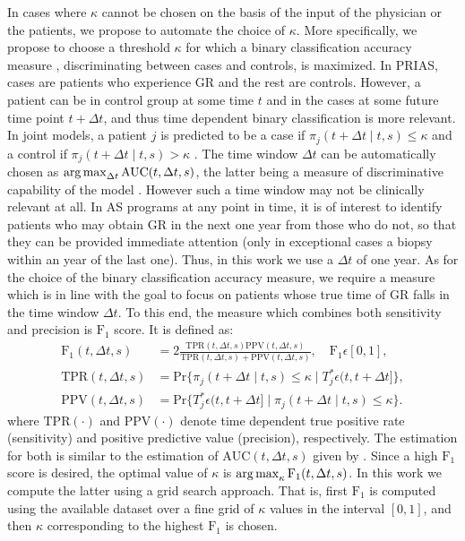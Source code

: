 In cases where $\kappa$ cannot be chosen on the basis of the input of the physician or the patients, we propose to automate the choice of $\kappa$. More specifically, we propose to choose a threshold $\kappa$ for which a binary classification accuracy measure \citep{lopez2014optimalcutpoints}, discriminating between cases and controls, is maximized. In PRIAS, cases are patients who experience GR and the rest are controls. However, a patient can be in control group at some time $t$ and in the cases at some future time point $t + \Delta t$, and thus time dependent binary classification is more relevant. In joint models, a patient $j$ is predicted to be a case if $\pi_j(t + \Delta t \mid t,s) \leq \kappa$ and a control if $\pi_j(t + \Delta t \mid t,s) > \kappa$ \citep*{rizopoulosJMbayes, landmarking2017}. The time window $\Delta t$ can be automatically chosen as $\operatorname{arg\,max}_{\Delta t}\mbox{AUC}(t, \Delta t, s)$, the latter being a measure of discriminative capability of the model \citep{rizopoulosJMbayes,landmarking2017}. However such a time window may not be clinically relevant at all. In AS programs at any point in time, it is of interest to identify patients who may obtain GR in the next one year from those who do not, so that they can be provided immediate attention (only in exceptional cases a biopsy within an year of the last one). Thus, in this work we use a $\Delta t$ of one year. As for the choice of the binary classification accuracy measure, we require a measure which is in line with the goal to focus on patients whose true time of GR falls in the time window $\Delta t$. To this end, the measure which combines both sensitivity and precision is $\mbox{F}_1$ score. It is defined as:
\begin{align*}
\mbox{F}_1(t, \Delta t, s) &= 2\frac{\mbox{TPR}(t, \Delta t, s) \mbox{PPV}(t, \Delta t, s)}{\mbox{TPR}(t, \Delta t, s) + \mbox{PPV}(t, \Delta t, s)}, \quad \mbox{F}_1 \epsilon [0,1],\\
\mbox{TPR}(t, \Delta t, s) &= \mbox{Pr}\big\{\pi_j(t + \Delta t \mid t,s) \leq \kappa \mid T^*_j \epsilon (t, t + \Delta t]\big\},\\
\mbox{PPV}(t, \Delta t, s) &= \mbox{Pr}\big\{T^*_j \epsilon (t, t + \Delta t] \mid \pi_j(t + \Delta t \mid t,s) \leq \kappa \big\}.
\end{align*}
where $\mbox{TPR}(\cdot)$ and $\mbox{PPV}(\cdot)$ denote time dependent true positive rate (sensitivity) and positive predictive value (precision), respectively. The estimation for both is similar to the estimation of $\mbox{AUC}(t, \Delta t, s)$ given by \citet{landmarking2017}. Since a high $\mbox{F}_1$ score is desired, the optimal value of $\kappa$ is $\operatorname{arg\,max}_{\kappa} \mbox{F}_1(t, \Delta t, s)$. In this work we compute the latter using a grid search approach. That is, first $\mbox{F}_1$ is computed using the available dataset over a fine grid of $\kappa$ values in the interval $[0,1]$, and then $\kappa$ corresponding to the highest $\mbox{F}_1$ is chosen.